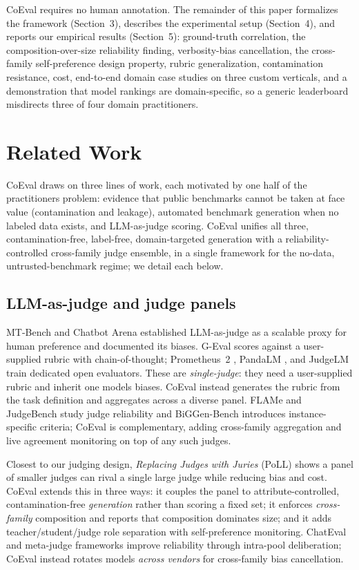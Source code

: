 \documentclass[11pt,a4paper]{article}
\begin{document}
CoEval requires no human annotation. The remainder of this paper formalizes the framework (Section~3), describes the experimental
setup (Section~4), and reports our empirical results (Section~5): ground-truth correlation, the
composition-over-size reliability finding, verbosity-bias cancellation, the cross-family self-preference design
property, rubric generalization, contamination resistance, cost, end-to-end domain case studies on three custom verticals, and a demonstration that model rankings are domain-specific, so a generic leaderboard misdirects three of four domain practitioners.

\section{Related Work}\label{related-work}

CoEval draws on three lines of work, each motivated by one half of the practitioner\textquotesingle s problem: evidence that public
benchmarks cannot be taken at face value (contamination and leakage), automated benchmark generation when no labeled
data exists, and LLM-as-judge scoring. CoEval unifies all three, contamination-free, label-free, domain-targeted
generation with a reliability-controlled cross-family judge ensemble, in a single framework for the no-data,
untrusted-benchmark regime; we detail each below.

\subsection{LLM-as-judge and judge panels}\label{llm-as-judge-and-judge-panels}

MT-Bench and Chatbot Arena \citep{ref1} established LLM-as-judge as a scalable proxy for human preference and
documented its biases. G-Eval \citep{ref2} scores against a user-supplied rubric with chain-of-thought;
Prometheus~2 \citep{ref3}, PandaLM \citep{ref34}, and JudgeLM \citep{ref35} train
dedicated open evaluators. These are \emph{single-judge}: they need a user-supplied rubric and inherit one model\textquotesingle s
biases. CoEval instead generates the rubric from the task definition and aggregates across a diverse panel. FLAMe
\citep{ref4} and JudgeBench \citep{ref6} study judge reliability and BiGGen-Bench
\citep{ref7} introduces instance-specific criteria; CoEval is complementary, adding cross-family aggregation
and live agreement monitoring on top of any such judges.

Closest to our judging design, \emph{Replacing Judges with Juries} (PoLL) \citep{ref5} shows a panel of
smaller judges can rival a single large judge while reducing bias and cost. CoEval extends this in three ways: it
couples the panel to attribute-controlled, contamination-free \emph{generation} rather than scoring a fixed set; it
enforces \emph{cross-family} composition and reports that composition dominates size; and it adds teacher/student/judge
role separation with self-preference monitoring. ChatEval \citep{ref21} and meta-judge frameworks
\citep{ref26} improve reliability through intra-pool deliberation; CoEval instead rotates models
\emph{across vendors} for cross-family bias cancellation.
\end{document}
